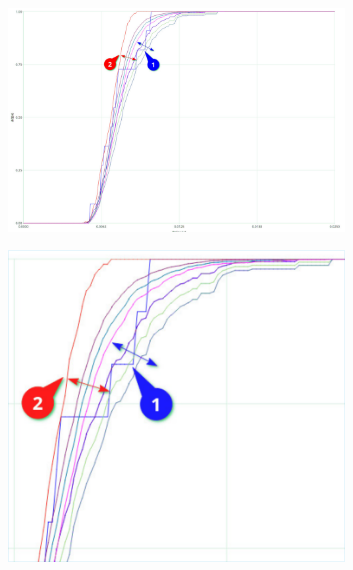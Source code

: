        \begin{figure}[H]
            \centering
            \begin{subfigure}{.5\textwidth}
                \centering
                \includegraphics[width=0.98\textwidth]{img/overload_2/150_probe2.pdf}
                \label{fig:ovuvv}
            \end{subfigure}%
            \begin{subfigure}{.5\textwidth}
                \centering
                \includegraphics[width =0.98\textwidth]{img/overload_2/150_probe2zoom_cropped.pdf}
                \label{fig:ovovv}
            \end{subfigure}
            \label{fig:avavv} 
        \end{figure}
    
